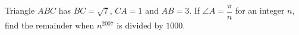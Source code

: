Triangle $ABC$ has $BC=\sqrt7$, $CA=1$ and $AB=3$. If $\angle A=\dfrac\pi n$ for an integer $n$, find the remainder when $n^{2007}$ is divided by $1000$.
